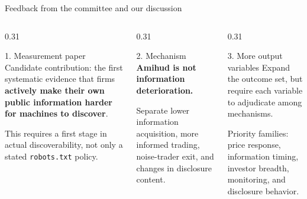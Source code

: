 \documentclass[aspectratio=169,10pt]{beamer}
\begin{document}
\begin{frame}[t]{Feedback from the committee and our discussion}
\vspace{0.20cm}
\begin{columns}[T,onlytextwidth]
  \begin{column}{0.31\textwidth}
    \begin{block}{1. Measurement paper}
      \small
      Candidate contribution: the first systematic evidence that firms \textbf{actively make their own public information harder for machines to discover}.

      \vspace{0.12cm}
      This requires a first stage in actual discoverability, not only a stated \texttt{robots.txt} policy.
    \end{block}
  \end{column}
  \begin{column}{0.31\textwidth}
    \begin{block}{2. Mechanism}
      \small
      \textbf{Amihud is not information deterioration.}

      \vspace{0.12cm}
      Separate lower information acquisition, more informed trading, noise-trader exit, and changes in disclosure content.
    \end{block}
  \end{column}
  \begin{column}{0.31\textwidth}
    \begin{block}{3. More output variables}
      \small
      Expand the outcome set, but require each variable to adjudicate among mechanisms.

      \vspace{0.12cm}
      Priority families: price response, information timing, investor breadth, monitoring, and disclosure behavior.
    \end{block}
  \end{column}
\end{columns}
\end{frame}
\end{document}
